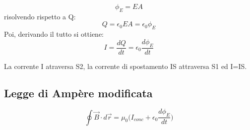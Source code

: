 \begin{equation}
    \phi_E = EA
\end{equation}
risolvendo rispetto a Q:
\begin{equation}
    Q = \epsilon_0 EA = \epsilon_0\phi_E
\end{equation}
Poi, derivando il tutto si ottiene:
\begin{equation}
    I = \frac{dQ}{dt} = \epsilon_0\frac{d\phi_E}{dt}
\end{equation}


La corrente I atraversa S2, la corrente di spostamento
IS attraversa S1 ed I=IS.

\subsection{Legge di Ampère modificata}
\begin{equation}
    \oint{\vec{B}\cdot d\vec{r}} = \mu_0\Bigg(I_{conc} + 
    \epsilon_0\frac{d\phi_E}{dt}\Bigg)
\end{equation}